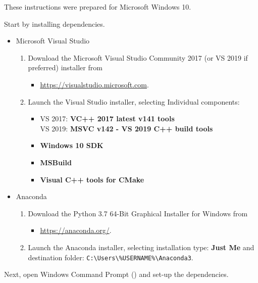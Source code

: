 \documentclass{esysdoc}
\begin{document}
\noindent These instructions were prepared for Microsoft Windows 10.

\noindent Start by installing \escript dependencies.

\begin{itemize}
\item Microsoft Visual Studio
\begin{enumerate}
\item Download the Microsoft Visual Studio Community 2017 (or VS 2019 if
preferred) installer from
\begin{itemize}
\item[] \url{https://visualstudio.microsoft.com}.
\end{itemize}
\item Launch the Visual Studio installer, selecting Individual components:
\begin{itemize}
\item VS 2017: \textbf{VC++ 2017 latest v141 tools} \\
VS 2019: \textbf{MSVC v142 - VS 2019 C++ build tools}
\item \textbf{Windows 10 SDK}
\item \textbf{MSBuild}
\item \textbf{Visual C++ tools for CMake}
\end{itemize}
\end{enumerate}
\item Anaconda
\begin{enumerate}
\item Download the Python 3.7 64-Bit Graphical Installer for Windows from
\begin{itemize}
\item[] \url{https://anaconda.org/}.
\end{itemize}
\item Launch the Anaconda installer, selecting installation type: \textbf{Just
Me} and destination folder: \newline \verb!C:\Users\%USERNAME%\Anaconda3!.
\end{enumerate}
\end{itemize}

\noindent Next, open Windows Command Prompt () and set-up the
\escript dependencies.
\end{document}
